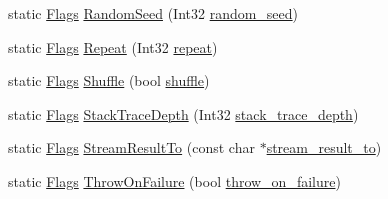 \begin{DoxyCompactItemize}
static \hyperlink{structtesting_1_1_flags}{Flags} \hyperlink{structtesting_1_1_flags_a695cd8b8ab44df5eaa371bacded78c05}{Random\+Seed} (Int32 \hyperlink{structtesting_1_1_flags_a4728bce63433f711205fd7b427e57f1b}{random\+\_\+seed})
\item 
static \hyperlink{structtesting_1_1_flags}{Flags} \hyperlink{structtesting_1_1_flags_a19d47e87d77a18ef4fa8a85b74e25956}{Repeat} (Int32 \hyperlink{structtesting_1_1_flags_a61614dd07f97f6e04d27c004ff15195e}{repeat})
\item 
static \hyperlink{structtesting_1_1_flags}{Flags} \hyperlink{structtesting_1_1_flags_a19ddbbaed61bda44a1940333b7c5a469}{Shuffle} (bool \hyperlink{structtesting_1_1_flags_a51c689e47e0f55c16116ac2a1d3b05d6}{shuffle})
\item 
static \hyperlink{structtesting_1_1_flags}{Flags} \hyperlink{structtesting_1_1_flags_a16b01d8bcceaa9fa8211fd24faa75b5a}{Stack\+Trace\+Depth} (Int32 \hyperlink{structtesting_1_1_flags_a20c6592453909c1adace64bf6a2bc2de}{stack\+\_\+trace\+\_\+depth})
\item 
static \hyperlink{structtesting_1_1_flags}{Flags} \hyperlink{structtesting_1_1_flags_a9cf0f64310b28eadbbfbb35584ebfc71}{Stream\+Result\+To} (const char $\ast$\hyperlink{structtesting_1_1_flags_ab09849fd3e095d5628dec65ec4dce9e1}{stream\+\_\+result\+\_\+to})
\item 
static \hyperlink{structtesting_1_1_flags}{Flags} \hyperlink{structtesting_1_1_flags_ad856df862414ed0dadf80b5e03829cc7}{Throw\+On\+Failure} (bool \hyperlink{structtesting_1_1_flags_ab8e7d21e31e641efe47b8050759e001a}{throw\+\_\+on\+\_\+failure})
\end{DoxyCompactItemize}
